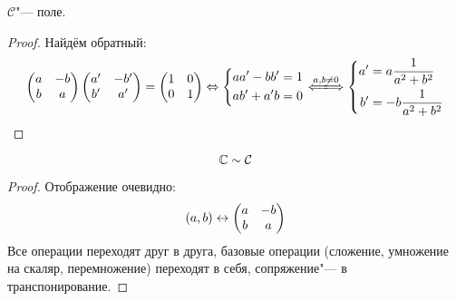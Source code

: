 \begin{assertion}
$\mathcal{C}$"--- поле.
\end{assertion}
\begin{proof}
Найдём обратный:
$$\left(\begin{matrix}a & -b \\ b & a\end{matrix}\right)\left(\begin{matrix}a' & -b' \\ b' & a'\end{matrix}\right) = \left(\begin{matrix}1 & 0 \\ 0 & 1\end{matrix}\right) 
\Lra \left\{\begin{aligned}aa'-bb' &= 1 \\ ab'+a'b &= 0\end{aligned}\right.\xLongleftrightarrow{a, b \ne 0} \left\{\begin{aligned}a' &= a\frac1{a^2+b^2} \\ b' &= -b\frac1{a^2+b^2}\end{aligned}\right.$$
\end{proof}

\begin{assertion}
$$\mathbb{C} \sim \mathcal{C}$$
\end{assertion}
\begin{proof}
Отображение очевидно:
$$(a, b) \leftrightarrow \left(\begin{matrix}a & -b \\ b & a\end{matrix}\right)$$
Все операции переходят друг в друга, базовые операции (сложение, умножение на скаляр, перемножение) переходят в себя, сопряжение"--- в транспонирование.
\end{proof}
